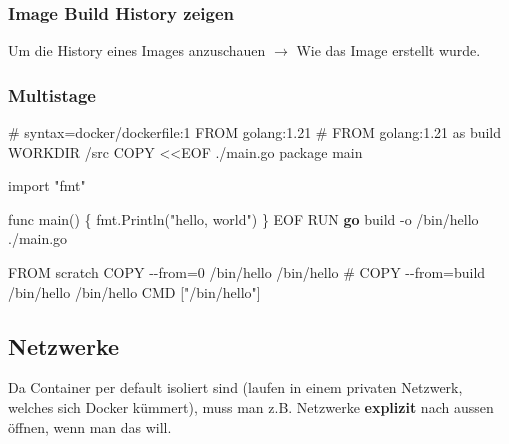 \documentclass[
  10pt,
  a4paper,
  twocolumn]{article}
\newenvironment{Shaded}{}{}
\newcommand{\AttributeTok}[1]{\textcolor[rgb]{0.84,0.23,0.29}{#1}}
\newcommand{\CommentTok}[1]{\textcolor[rgb]{0.42,0.45,0.49}{#1}}
\newcommand{\CommentVarTok}[1]{\textcolor[rgb]{0.42,0.45,0.49}{#1}}
\newcommand{\ExtensionTok}[1]{\textcolor[rgb]{0.84,0.23,0.29}{\textbf{#1}}}
\newcommand{\KeywordTok}[1]{\textcolor[rgb]{0.84,0.23,0.29}{#1}}
\newcommand{\NormalTok}[1]{\textcolor[rgb]{0.14,0.16,0.18}{#1}}
\newcommand{\OperatorTok}[1]{\textcolor[rgb]{0.14,0.16,0.18}{#1}}
\newcommand{\StringTok}[1]{\textcolor[rgb]{0.01,0.18,0.38}{#1}}
\begin{document}
\subsubsection{Image Build History
zeigen}\label{image-build-history-zeigen}

Um die History eines Images anzuschauen \(\rightarrow\) Wie das Image
erstellt wurde.

\begin{Shaded}
\end{Shaded}

\subsubsection{Multistage}\label{multistage}

\begin{Shaded}
\begin{Highlighting}[]
\CommentTok{\# }\CommentVarTok{syntax=docker/dockerfile:1}
\KeywordTok{FROM}\NormalTok{ golang:1.21}
\CommentTok{\# FROM golang:1.21 as build}
\KeywordTok{WORKDIR}\NormalTok{ /src}
\KeywordTok{COPY}\NormalTok{ \textless{}\textless{}EOF ./main.go}
\NormalTok{package main}

\NormalTok{import }\StringTok{"fmt"}

\NormalTok{func main() \{}
\NormalTok{  fmt.Println(}\StringTok{"hello, world"}\NormalTok{)}
\NormalTok{\}}
\NormalTok{EOF}
\KeywordTok{RUN} \ExtensionTok{go}\NormalTok{ build }\AttributeTok{{-}o}\NormalTok{ /bin/hello ./main.go}

\KeywordTok{FROM}\NormalTok{ scratch}
\KeywordTok{COPY} \OperatorTok{{-}{-}from=0}\NormalTok{ /bin/hello /bin/hello}
\CommentTok{\# COPY {-}{-}from=build /bin/hello /bin/hello}
\KeywordTok{CMD}\NormalTok{ [}\StringTok{"/bin/hello"}\NormalTok{]}
\end{Highlighting}
\end{Shaded}

\subsection{Netzwerke}\label{netzwerke}

Da Container per default isoliert sind (laufen in einem privaten
Netzwerk, welches sich Docker kümmert), muss man z.B. Netzwerke
\textbf{explizit} nach aussen öffnen, wenn man das will.
\end{document}
